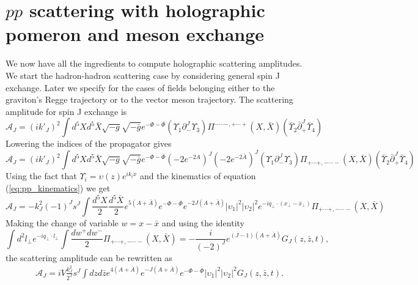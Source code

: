 \documentclass[10 pt]{article}
\begin{document}
\section{$pp$ scattering with holographic pomeron and meson exchange}
We now have all the ingredients to compute holographic scattering amplitudes. We start the hadron-hadron scattering case by considering general spin J exchange. Later we specify for the cases of fields belonging either to the graviton's Regge trajectory or to the vector meson trajectory. The scattering amplitude for spin J exchange is
\begin{equation}
\mathcal{A}_J = {\left(i k'_J\right)}^2 \int d^5X d^5\bar{X} \sqrt{-g} \sqrt{-\bar{g}} e^{- \Phi -\bar{\Phi}} \left(\Upsilon_1 \partial_{-}^J \Upsilon_3\right) \Pi^{-\cdots-, + \cdots +} \left(X, \bar{X}\right) \left(\bar{\Upsilon}_2 \bar{\partial}_{+}^J \bar{\Upsilon}_4\right)
\end{equation}
Lowering the indices of the propagator gives
\begin{equation}
\mathcal{A}_J = {\left(i k'_J\right)}^2 \int d^5X d^5\bar{X} \sqrt{-g} \sqrt{-\bar{g}} e^{- \Phi -\bar{\Phi}} {\left(-2 e^{-2 A }\right)}^J {\left(-2 e^{-2 \bar{A} }\right)}^J \left(\Upsilon_1 \partial_{-}^J \Upsilon_3\right) \Pi_{+\cdots+, - \cdots -} \left(X, \bar{X}\right) \left(\bar{\Upsilon}_2 \bar{\partial}_{+}^J \bar{\Upsilon}_4\right)
\end{equation}
Using the fact that $\Upsilon_i = \upsilon\left(z\right) e^{i k_i \dot x}$ and the kinematics of equation (\ref{eq:pp_kinematics}) we get
\begin{equation}
\mathcal{A}_J = - k_J^2 {\left(-1\right)}^J s^J \int \frac{d^5X}{2}\frac{d^5\bar{X}}{2} e^{5\left(A+\bar{A}\right)} e^{-\Phi - \bar{\Phi}} e^{-2J\left(A+\bar{A}\right)} {|\upsilon_1|}^2 {|\upsilon_2|}^2 e^{-i q_\perp \cdot \left(x_\perp - \bar{x}_\perp\right)} \Pi_{+ \cdots +, - \cdots -} \left(X, \bar{X}\right)
\end{equation}
Making the change of variable $w = x - \bar{x}$  and using the identity
\begin{equation}
\int d^2 l_\perp e^{- i q_\perp \cdot l_\perp}\int \frac{dw^+ dw^-}{2} \Pi_{+\cdots+, - \cdots -} \left(X, \bar{X}\right) = - \frac{i}{\left(-2\right)^J} e^{\left(J-1\right)\left(A+\bar{A}\right)} G_J \left(z, \bar{z}, t\right),
\end{equation}
the scattering amplitude can be rewritten as
\begin{align}
\mathcal{A}_J = i V \frac{k_J^2}{2^J} s^J \int dz d\bar{z} e^{4\left(A+\bar{A}\right)} e^{-J\left(A+\bar{A}\right)} e^{-\Phi - \bar{\Phi}} {|\upsilon_1|}^2 {|\upsilon_2|}^2  G_J \left(z, \bar{z}, t\right).
\end{align}
\end{document}
